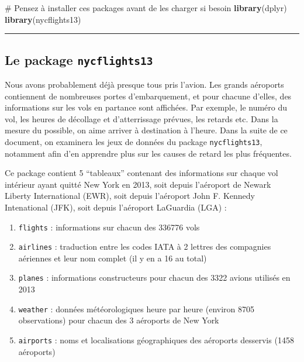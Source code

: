 \documentclass[
  a4paper,
]{article}
\newenvironment{Shaded}{\begin{snugshade}}{\end{snugshade}}
\newcommand{\CommentTok}[1]{\textcolor[rgb]{0.54,0.53,0.53}{#1}}
\newcommand{\KeywordTok}[1]{\textcolor[rgb]{0.12,0.11,0.11}{\textbf{#1}}}
\newcommand{\NormalTok}[1]{\textcolor[rgb]{0.12,0.11,0.11}{#1}}
\providecommand{\tightlist}{%
  \setlength{\itemsep}{0pt}\setlength{\parskip}{0pt}}
\begin{document}
\begin{Shaded}
\begin{Highlighting}[]
\CommentTok{# Pensez à installer ces packages avant de les charger si besoin}
\KeywordTok{library}\NormalTok{(dplyr)}
\KeywordTok{library}\NormalTok{(nycflights13)}
\end{Highlighting}
\end{Shaded}

\begin{center}\rule{0.5\linewidth}{0.5pt}\end{center}

\hypertarget{le-package-nycflights13}{%
\subsection{\texorpdfstring{Le package \texttt{nycflights13}}{Le package nycflights13}}\label{le-package-nycflights13}}

Nous avons probablement déjà presque tous pris l'avion. Les grands aéroports contiennent de nombreuses portes d'embarquement, et pour chacune d'elles, des informations sur les vols en partance sont affichées. Par exemple, le numéro du vol, les heures de décollage et d'atterrissage prévues, les retards etc. Dans la mesure du possible, on aime arriver à destination à l'heure. Dans la suite de ce document, on examinera les jeux de données du package \texttt{nycflights13}, notamment afin d'en apprendre plus sur les causes de retard les plus fréquentes.

Ce package contient 5 ``tableaux'' contenant des informations sur chaque vol intérieur ayant quitté New York en 2013, soit depuis l'aéroport de Newark Liberty International (EWR), soit depuis l'aéroport John F. Kennedy Intenational (JFK), soit depuis l'aéroport LaGuardia (LGA) :

\begin{enumerate}
\def\labelenumi{\arabic{enumi}.}
\tightlist
\item
  \texttt{flights} : informations sur chacun des 336776 vols
\item
  \texttt{airlines} : traduction entre les codes IATA à 2 lettres des compagnies aériennes et leur nom complet (il y en a 16 au total)
\item
  \texttt{planes} : informations constructeurs pour chacun des 3322 avions utilisés en 2013
\item
  \texttt{weather} : données météorologiques heure par heure (environ 8705 observations) pour chacun des 3 aéroports de New York
\item
  \texttt{airports} : noms et localisations géographiques des aéroports desservis (1458 aéroports)
\end{enumerate}
\end{document}
